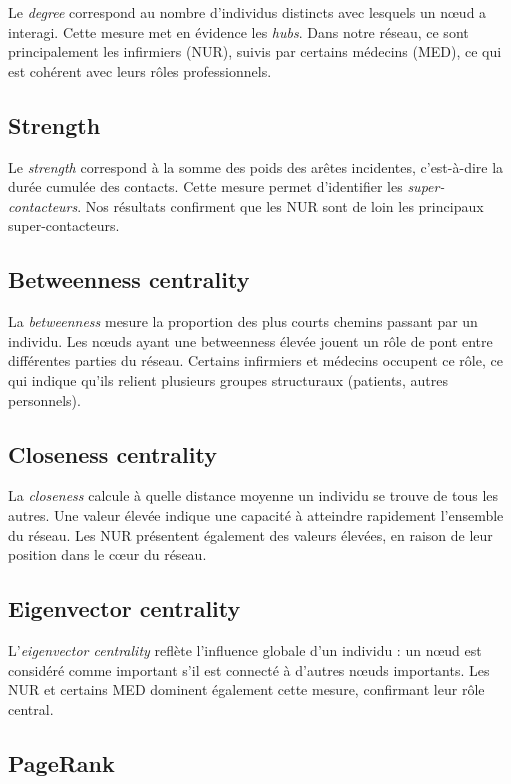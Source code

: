 \documentclass[10pt,twocolumn]{article}
\begin{document}
Le \textit{degree} correspond au nombre d'individus distincts avec lesquels un nœud a interagi.
Cette mesure met en évidence les \textit{hubs}.
Dans notre réseau, ce sont principalement les infirmiers (NUR), suivis par certains médecins (MED), ce qui est cohérent avec leurs rôles professionnels.

\subsection{Strength}

Le \textit{strength} correspond à la somme des poids des arêtes incidentes, c'est-à-dire la durée cumulée des contacts.
Cette mesure permet d'identifier les \textit{super-contacteurs}.
Nos résultats confirment que les NUR sont de loin les principaux super-contacteurs.

\subsection{Betweenness centrality}

La \textit{betweenness} mesure la proportion des plus courts chemins passant par un individu.
Les nœuds ayant une betweenness élevée jouent un rôle de pont entre différentes parties du réseau.
Certains infirmiers et médecins occupent ce rôle, ce qui indique qu'ils relient plusieurs groupes structuraux (patients, autres personnels).

\subsection{Closeness centrality}

La \textit{closeness} calcule à quelle distance moyenne un individu se trouve de tous les autres.
Une valeur élevée indique une capacité à atteindre rapidement l'ensemble du réseau.
Les NUR présentent également des valeurs élevées, en raison de leur position dans le cœur du réseau.

\subsection{Eigenvector centrality}

L'\textit{eigenvector centrality} reflète l'influence globale d'un individu : un nœud est considéré comme important s'il est connecté à d'autres nœuds importants.
Les NUR et certains MED dominent également cette mesure, confirmant leur rôle central.

\subsection{PageRank}
\end{document}

